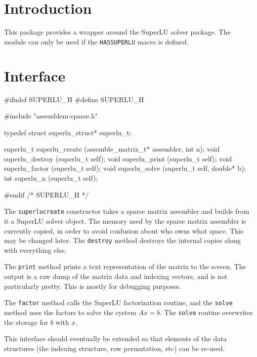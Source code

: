 
\section{Introduction}

This package provides a wrapper around the SuperLU solver package.
The module can only be used if the {\tt{}HAS{}SUPERLU} macro is defined.


\section{Interface}

\endmoddef
#ifndef SUPERLU_H
#define SUPERLU_H

#include "assemblem-sparse.h"

typedef struct superlu_struct* superlu_t;

superlu_t superlu_create  (assemble_matrix_t* assembler, int n);
void      superlu_destroy (superlu_t self);
void      superlu_print   (superlu_t self);
void      superlu_factor  (superlu_t self);
void      superlu_solve   (superlu_t self, double* b);
int       superlu_n       (superlu_t self);

#endif /* SUPERLU_H   */
\nwendcode{}\nwdocspar

The {\tt{}superlu{}create} constructor takes a sparse matrix assembler and
builds from it a SuperLU solver object.  The memory used by the sparse
matrix assembler is currently copied, in order to avoid confusion
about who owns what space.  This may be changed later.  The {\tt{}destroy}
method destroys the internal copies along with everything else.

The {\tt{}print} method prints a text representation of the matrix to the
screen.  The output is a raw dump of the matrix data and indexing vectors,
and is not particularly pretty.  This is mostly for debugging purposes.

The {\tt{}factor} method calls the SuperLU factorization routine, and
the {\tt{}solve} method uses the factors to solve the system $Ax = b$.
The {\tt{}solve} routine overwrites the storage for $b$ with $x$.

This interface should eventually be extended so that elements of the
data structures (the indexing structure, row permutation, etc) can
be re-used.


